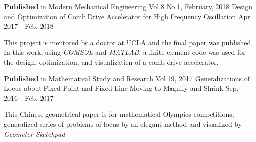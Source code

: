 \begin{cventries}

  \cventry
    {\textbf{Published} in Modern Mechanical Engineering Vol.8 No.1, February, 2018} %
    {Design and Optimization of Comb Drive Accelerator for High Frequency Oscillation} %
    {} %
    {Apr. 2017 - Feb. 2018} %
    {
      \begin{cvitems} %
        \item {This project is mentored by a doctor at UCLA and the final paper was published. In this work, using \textit{COMSOL} and \textit{MATLAB}, a finite element code was used for the design, optimization, and visualization of a comb drive accelerator.}
      \end{cvitems}
    }
    
  \cventry
    {\textbf{Published} in Mathematical Study and Research Vol 19, 2017} %
    {Generalizations of Locus about Fixed Point and Fixed Line Moving to Magnify and Shrink} %
    {} %
    {Sep. 2016 - Feb. 2017} %
    {
      \begin{cvitems} %
        \item {This Chinese geometrical paper is for mathematical Olympics competitions, generalized series of problems of locus by an elegant method and visualized by \textit{Geometer Sketchpad}}
      \end{cvitems}
    }
    

\end{cventries}
